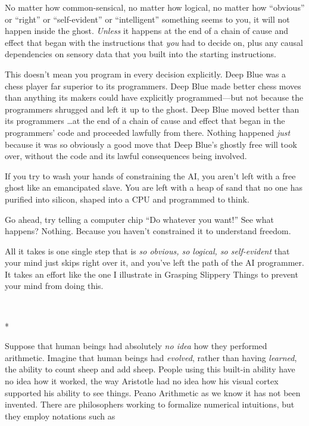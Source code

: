 {
 No matter how common-sensical, no matter how logical, no matter
how ``obvious'' or
``right'' or
``self-evident'' or
``intelligent'' something seems to
you, it will not happen inside the ghost. \textit{Unless} it happens at
the end of a chain of cause and effect that began with the instructions
that \textit{you} had to decide on, plus any causal dependencies on
sensory data that you built into the starting instructions.}

{
 This doesn't mean you program in every decision
explicitly. Deep Blue was a chess player far superior to its
programmers. Deep Blue made better chess moves than anything its makers
could have explicitly programmed---but not because the programmers
shrugged and left it up to the ghost. Deep Blue moved better than its
programmers \ldots at the end of a chain of cause and effect that began
in the programmers' code and proceeded lawfully from
there. Nothing happened \textit{just} because it was so obviously a
good move that Deep Blue's ghostly free will took over,
without the code and its lawful consequences being involved.}

{
 If you try to wash your hands of constraining the AI, you
aren't left with a free ghost like an emancipated
slave. You are left with a heap of sand that no one has purified into
silicon, shaped into a CPU and programmed to think.}

{
 Go ahead, try telling a computer chip ``Do
whatever you want!'' See what happens? Nothing.
Because you haven't constrained it to understand
freedom.}

{
 All it takes is one single step that is \textit{so obvious, so
logical, so self-evident} that your mind just skips right over it, and
you've left the path of the AI programmer. It takes an
effort like the one I illustrate in Grasping Slippery Things to prevent
your mind from doing this.}

{\centering
 \ ~
\par}

{\centering
 *
\par}


{
 Suppose that human beings had absolutely \textit{no idea} how they
performed arithmetic. Imagine that human beings had \textit{evolved},
rather than having \textit{learned}, the ability to count sheep and add
sheep. People using this built-in ability have no idea how it worked,
the way Aristotle had no idea how his visual cortex supported his
ability to see things. Peano Arithmetic as we know it has not been
invented. There are philosophers working to formalize numerical
intuitions, but they employ notations such as}

